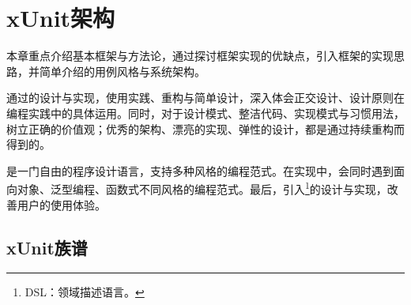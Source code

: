 \begin{savequote}[45mm]
\end{savequote}

\chapter{xUnit架构} 
\label{ch:xunit-architecture}

\begin{content}

本章重点介绍基本框架与方法论，通过探讨框架实现的优缺点，引入框架的实现思路，并简单介绍的用例风格与系统架构。

通过的设计与实现，使用实践、重构与简单设计，深入体会正交设计、设计原则在\cpp{}编程实践中的具体运用。同时，对于设计模式、整洁代码、实现模式与习惯用法，树立正确的价值观；优秀的架构、漂亮的实现、弹性的设计，都是通过持续重构而得到的。

\cpp{}是一门自由的程序设计语言，支持多种风格的编程范式。在实现中，会同时遇到面向对象、泛型编程、函数式不同风格的编程范式。最后，引入\footnote{DSL：领域描述语言。}的设计与实现，改善用户的使用体验。

\end{content}

\section{xUnit族谱}

